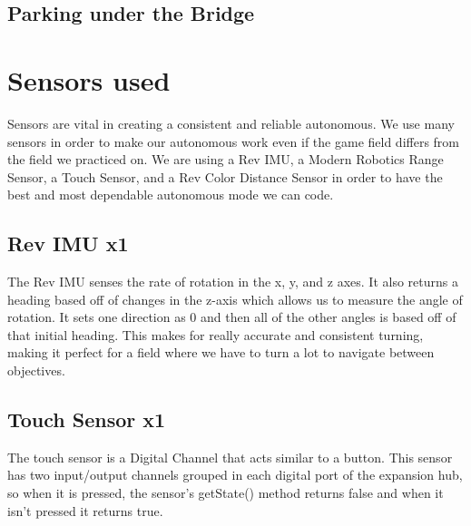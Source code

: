 \documentclass{article}
\begin{document}
\subsection{Parking under the Bridge}

\section{Sensors used}
Sensors are vital in creating a consistent and reliable autonomous. We use many sensors in order to make our autonomous work even if the game field differs from the field we practiced on. We are using a Rev IMU, a Modern Robotics Range Sensor, a Touch Sensor, and a Rev Color Distance Sensor in order to have the best and most dependable autonomous mode we can code.


\subsection[Rev IMU for Gyro Turning]{Rev IMU x1}
{The Rev IMU senses the rate of rotation in the x, y, and z axes. It also returns a heading based off of changes in the z-axis which allows us to measure the angle of rotation. It sets one direction as 0 and then all of the other angles is based off of that initial heading. This makes for really accurate and consistent turning, making it perfect for a field where we have to turn a lot to navigate between objectives.} \\


\subsection[Rev Touch Sensor]{Touch Sensor x1}
{The touch sensor is a Digital Channel that acts similar to a button. This sensor has two input/output channels grouped in each digital port of the expansion hub, so when it is pressed, the sensor’s getState() method returns false and when it isn’t pressed it returns true.}\\
\end{document}
